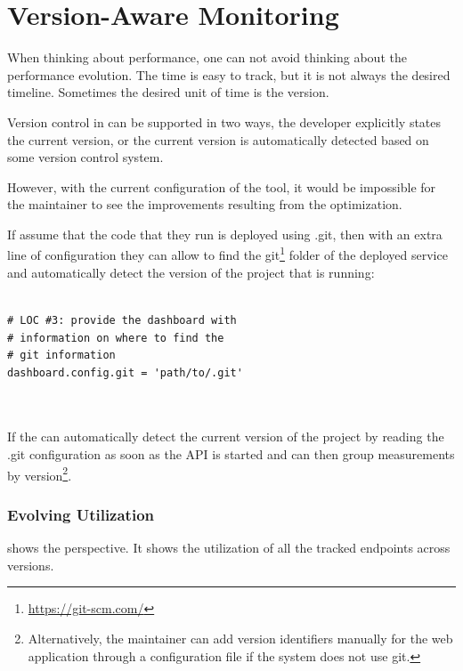   
  \section{Version-Aware Monitoring}
  

  When thinking about performance, 
  one can not avoid thinking about the performance evolution. 
  The time is easy to track, but it is not always the desired 
  timeline. Sometimes the desired unit of time is the version.

  Version control in \tool can be supported in two ways,
  the developer explicitly states the current version, 
  or the current version is automatically detected based
  on some version control system. 


  However, with the current configuration of the tool, it would be impossible for the maintainer to see the improvements resulting from the optimization. 

  If assume that the code that they run is deployed using .git, then with an extra line of configuration they can allow \tool to find the git\footnote{\url{https://git-scm.com/}} folder of the deployed service and automatically detect the version of the project that is running: 
    
\begin{lstlisting}[style=custompython]

# LOC #3: provide the dashboard with 
# information on where to find the 
# git information 
dashboard.config.git = 'path/to/.git'
  
      
\end{lstlisting}  
 
  If the \tool can automatically detect the current version of the project by reading the .git configuration as soon as the API is started and can then group measurements by version\footnote{Alternatively, the maintainer can add version identifiers manually for the web application through a configuration file if the system does not use git.}. 


  

  \subsubsection*{Evolving Utilization}

   shows the  perspective. 
  It shows the utilization of all the tracked endpoints across versions. 

